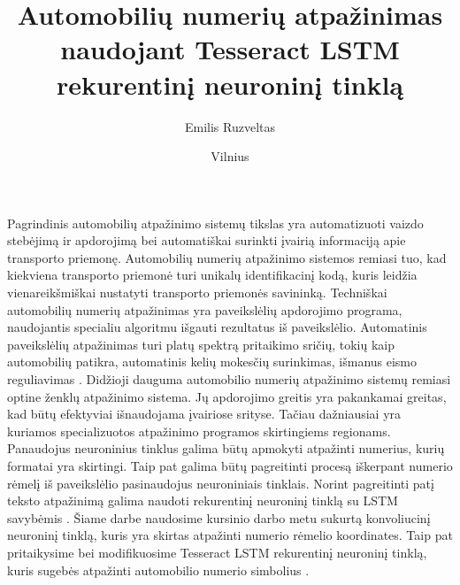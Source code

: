 \documentclass{VUMIFInfBakalaurinis}
\title{Automobilių numerių atpažinimas naudojant Tesseract LSTM rekurentinį neuroninį tinklą}
\author{Emilis Ruzveltas}
\date{Vilnius \\ \the\year}
\begin{document}
\maketitle

\newpage
{}
\newpage
\tableofcontents

\pagebreak
{}
Pagrindinis automobilių atpažinimo sistemų tikslas yra automatizuoti vaizdo stebėjimą ir
apdorojimą bei automatiškai surinkti įvairią informaciją apie transporto priemonę. Automobilių
numerių atpažinimo sistemos remiasi tuo, kad kiekviena transporto priemonė turi unikalų 
identifikacinį kodą, kuris leidžia vienareikšmiškai nustatyti transporto priemonės savininką. Techniškai
automobilių numerių atpažinimas yra paveikslėlių apdorojimo programa, naudojantis specialiu 
algoritmu išgauti rezultatus iš paveikslėlio. Automatinis paveikslėlių atpažinimas turi platų spektrą
pritaikimo sričių, tokių kaip automobilių patikra, automatinis kelių mokesčių surinkimas, išmanus
eismo reguliavimas \cite{bhushan2013license}. Didžioji dauguma automobilio numerių atpažinimo sistemų remiasi
optine ženklų atpažinimo sistema. Jų apdorojimo greitis yra pakankamai greitas, kad būtų 
efektyviai išnaudojama įvairiose srityse. Tačiau dažniausiai yra kuriamos specializuotos atpažinimo
programos skirtingiems regionams. Panaudojus neuroninius tinklus galima būtų apmokyti 
atpažinti numerius, kurių formatai yra skirtingi. Taip pat galima būtų pagreitinti procesą iškerpant
numerio rėmelį iš paveikslėlio pasinaudojus neuroniniais tinklais. Norint pagreitinti patį 
teksto atpažinimą galima naudoti rekurentinį neuroninį tinklą su LSTM savybėmis \cite{li2016reading}. Šiame
darbe naudosime kursinio darbo metu sukurtą konvoliucinį neuroninį tinklą, kuris yra skirtas 
atpažinti numerio rėmelio koordinates. Taip pat pritaikysime bei modifikuosime Tesseract LSTM
rekurentinį neuroninį tinklą, kuris sugebės atpažinti automobilio numerio simbolius \cite{smith2007overview}.
\end{document}
